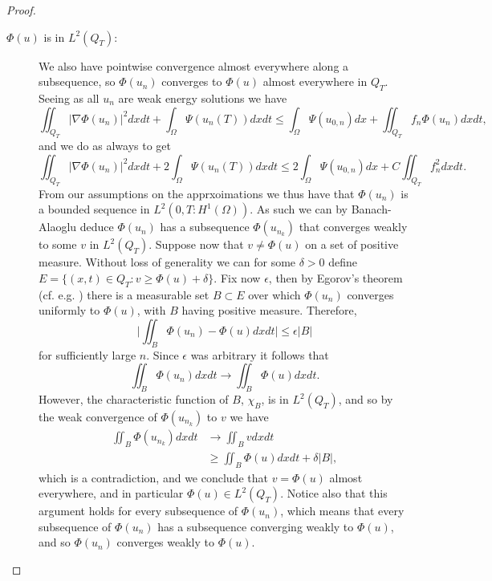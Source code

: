 \documentclass[11pt, a4paper]{article}
\begin{document}
\begin{proof}
\begin{description}
\item[$\Phi(u)$ is in $L^2(Q_T)$:]
We also have pointwise convergence almost everywhere along a subsequence, so $\Phi(u_n)$ converges to $\Phi(u)$ almost everywhere in $Q_T$. Seeing as all $u_n$ are weak energy solutions we have
\begin{equation*}
\iint_{Q_T}|\nabla \Phi(u_n)|^2dxdt + \int_\Omega \Psi(u_n(T)) dxdt \leq \int_\Omega \Psi(u_{0,n}) dx + \iint_{Q_T} f_n \Phi(u_n)dxdt,
\end{equation*}
and we do as always to get
\begin{equation*}
\iint_{Q_T}|\nabla \Phi(u_n)|^2dxdt + 2\int_\Omega \Psi(u_n(T)) dxdt \leq 2\int_\Omega \Psi(u_{0,n}) dx + C\iint_{Q_T} f_n^2 dxdt.
\end{equation*}
From our assumptions on the apprxoimations we thus have that $\Phi(u_n)$ is a bounded sequence in $L^2(0,T: H^1(\Omega))$. As such we can by Banach-Alaoglu deduce $\Phi(u_n)$ has a subsequence $\Phi(u_{n_k})$ that converges weakly to some  $v$ in $L^2(Q_T)$. Suppose now that $v \neq \Phi(u)$ on  a set of positive measure. Without loss of generality we can for some $\delta > 0$ define $E = \{ (x,t) \in Q_T: v \geq \Phi(u) + \delta\}$. Fix now $\epsilon$, then by Egorov's theorem (cf. e.g. \citep[p. 120]{weiss1999course}) there is a measurable set $B \subset E$ over which $\Phi(u_n)$ converges uniformly to $\Phi(u)$, with $B$ having positive measure. Therefore, 
\begin{equation*}
\big|\iint_{B}\Phi(u_n) - \Phi(u) dxdt \big| \leq \epsilon |B|  
\end{equation*}
for sufficiently large $n$. Since $\epsilon$ was arbitrary it follows that
\begin{equation*}
\iint_B \Phi(u_n) dxdt \to \iint_B \Phi(u) dxdt.
\end{equation*}
However, the characteristic function of $B$, $\chi_B$, is in $L^2(Q_T)$, and so by the weak convergence of $\Phi(u_{n_k})$ to $v$ we have
\begin{align*}
\iint_{B} \Phi(u_{n_k})dxdt & \to \iint_{B} v dxdt \\
& \geq \iint_{B} \Phi(u)dxdt + \delta|B|,
\end{align*}
which is a contradiction, and we conclude that $v=\Phi(u)$ almost everywhere, and in particular $\Phi(u) \in L^2(Q_T)$. Notice also that this argument holds for every subsequence of $\Phi(u_n)$, which means that every subsequence of $\Phi(u_n)$ has a subsequence converging weakly to $\Phi(u)$, and so $\Phi(u_n)$ converges weakly to $\Phi(u)$.




\end{description}
\end{proof}
\end{document}
